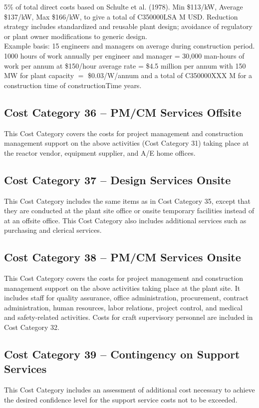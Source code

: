 5\% of total direct costs based on Schulte et al. (1978). Min \$113/kW, Average \$137/kW, Max
\$166/kW, to give a total of C350000LSA M USD.  Reduction strategy includes standardized and reusable plant design; avoidance of regulatory or
plant owner modifications to generic design.\\


Example basis: 15 engineers and managers on average during construction period.
1000 hours of work annually per engineer and manager = 30,000 man-hours of work per
annum at \$150/hour average rate = \$4.5 million per annum with 150 MW for plant capacity $=$ \$0.03/W/annum and a total of C350000XXX M for a construction time of constructionTime years.


\subsection*{Cost Category 36 – PM/CM Services Offsite}
This Cost Category covers the costs for project management and construction management support on the above activities (Cost Category 31) taking place at the reactor vendor, equipment supplier, and A/E home offices.

\subsection*{Cost Category 37 – Design Services Onsite}
This Cost Category includes the same items as in Cost Category 35, except that they are conducted at the plant site office or onsite temporary facilities instead of at an offsite office. This Cost Category also includes additional services such as purchasing and clerical services.

\subsection*{Cost Category 38 – PM/CM Services Onsite}
This Cost Category covers the costs for project management and construction management support on the above activities taking place at the plant site. It includes staff for quality assurance, office administration, procurement, contract administration, human resources, labor relations, project control, and medical and safety-related activities. Costs for craft supervisory personnel are included in Cost Category 32.

\subsection*{Cost Category 39 – Contingency on Support Services}
This Cost Category includes an assessment of additional cost necessary to achieve the desired confidence level for the support service costs not to be exceeded.

